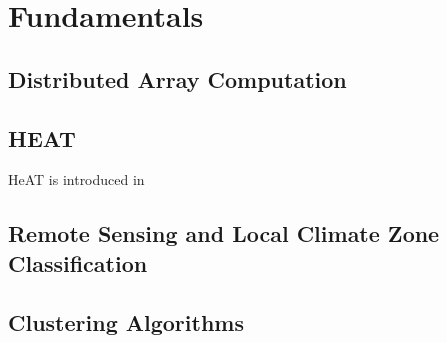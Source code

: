 \section{Fundamentals}
\label{sec:fundamentals}

\subsection{Distributed Array Computation}
\label{ssec:distributed_array_computation}

\subsection{HEAT}
\label{ssec:heat}
\gls{HeAT} is introduced in \cite{krajsek_helmholtz_nodate}

\subsection{Remote Sensing and Local Climate Zone Classification}
\label{ssec:remote_sensing_and_local_climate_zone_classification}

\subsection{Clustering Algorithms}
\label{ssec:clustering_algorithms}